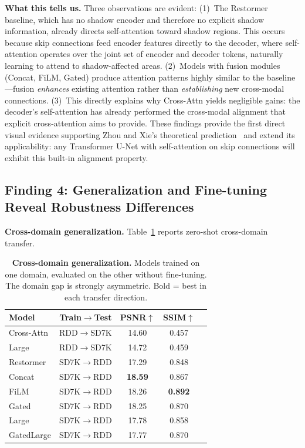 \documentclass[pdflatex,sn-basic,Numbered]{sn-jnl}
\theoremstyle{thmstyleone}
\theoremstyle{thmstyletwo}
\theoremstyle{thmstylethree}
\begin{document}
\textbf{What this tells us.}
Three observations are evident:
(1)~The Restormer baseline, which has no shadow encoder and therefore no explicit shadow information, already directs self-attention toward shadow regions.
This occurs because skip connections feed encoder features directly to the decoder, where self-attention operates over the joint set of encoder and decoder tokens, naturally learning to attend to shadow-affected areas.
(2)~Models with fusion modules (Concat, FiLM, Gated) produce attention patterns highly similar to the baseline---fusion \textit{enhances} existing attention rather than \textit{establishing} new cross-modal connections.
(3)~This directly explains why Cross-Attn yields negligible gains: the decoder's self-attention has already performed the cross-modal alignment that explicit cross-attention aims to provide.
These findings provide the first direct visual evidence supporting Zhou and Xie's theoretical prediction~\cite{zhou2026feature} and extend its applicability: any Transformer U-Net with self-attention on skip connections will exhibit this built-in alignment property.

\subsection{Finding 4: Generalization and Fine-tuning Reveal Robustness Differences}\label{sec:generalization}

\textbf{Cross-domain generalization.}
Table~\ref{tab:cross_domain} reports zero-shot cross-domain transfer.

\begin{table}[t]
\caption{\textbf{Cross-domain generalization.} Models trained on one domain, evaluated on the other without fine-tuning. The domain gap is strongly asymmetric. Bold = best in each transfer direction.}
\label{tab:cross_domain}
\begin{tabular}{@{}lcccc@{}}
\toprule
\textbf{Model} & \textbf{Train}$\rightarrow$Test & \textbf{PSNR}$\uparrow$ & \textbf{SSIM}$\uparrow$ \\
\midrule
Cross-Attn & RDD$\rightarrow$SD7K & 14.60 & 0.457 \\
Large      & RDD$\rightarrow$SD7K & 14.72 & 0.459 \\
\midrule
Restormer   & SD7K$\rightarrow$RDD & 17.29 & 0.848 \\
Concat      & SD7K$\rightarrow$RDD & \textbf{18.59} & 0.867 \\
FiLM        & SD7K$\rightarrow$RDD & 18.26 & \textbf{0.892} \\
Gated       & SD7K$\rightarrow$RDD & 18.25 & 0.870 \\
Large       & SD7K$\rightarrow$RDD & 17.78 & 0.858 \\
GatedLarge  & SD7K$\rightarrow$RDD & 17.77 & 0.870 \\
\bottomrule
\end{tabular}
\end{table}
\end{document}
